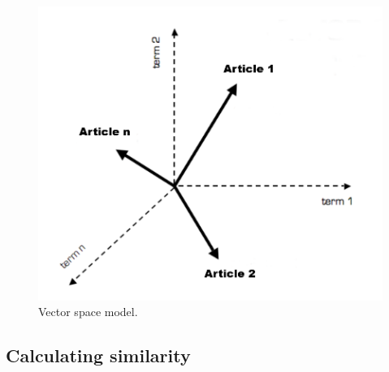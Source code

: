 \documentclass[conference]{IEEEtran}
\begin{document}
\begin{figure}[htbp]
\centering
\includegraphics[width=0.4 \textwidth]{figures/vector.png}
\caption{Vector space model.}
\label{vector}
\end{figure}

\subsection{Calculating similarity}\label{AA}
\end{document}

